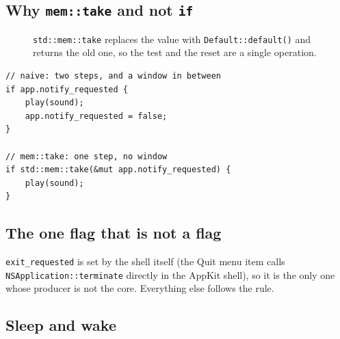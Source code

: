 \subsection{Why \texttt{mem::take} and not \texttt{if}}

\begin{figure}[H]
\centering
{}
\caption{\texttt{std::mem::take} replaces the value with \texttt{Default::default()} and
returns the old one, so the test and the reset are a single operation.}
\label{fig:memtake}
\end{figure}

\begin{lstlisting}[caption={The two versions side by side. The second is what both shells use.}]
// naive: two steps, and a window in between
if app.notify_requested {
    play(sound);
    app.notify_requested = false;
}

// mem::take: one step, no window
if std::mem::take(&mut app.notify_requested) {
    play(sound);
}
\end{lstlisting}

\subsection{The one flag that is not a flag}

\texttt{exit\_requested} is set by the shell itself (the Quit menu item calls
\texttt{NSApplication::terminate} directly in the AppKit shell), so it is the only one
whose producer is not the core. Everything else follows the rule.

\subsection{Sleep and wake}

